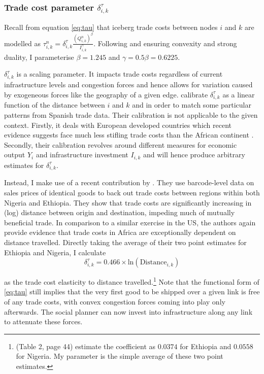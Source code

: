 \documentclass[11pt, oneside]{article}   	%
\begin{document}
\subsubsection{Trade cost parameter $\delta_{i,k}^{\tau}$}
Recall from equation \eqref{eq:tau} that iceberg trade costs between nodes $i$ and $k$ are modelled as $\tau_{i,k}^{n} = \delta^{\tau}_{i, k} \frac{(Q_{i,k}^{n})^{\beta}}{I_{i,k}^{\gamma}}$. Following \citeauthor{fajgelbaum_optimal_2017} and ensuring convexity and strong duality, I parameterise $\beta = 1.245$ and $\gamma = 0.5\beta = 0.6225$.

$\delta^{\tau}_{i, k}$ is a scaling parameter. It impacts trade costs regardless of current infrastructure levels and congestion forces and hence allows for variation caused by exogeneous forces like the geography of a given edge. \citeauthor{fajgelbaum_optimal_2017} calibrate $\delta^{\tau}_{i, k}$ as a linear function of the distance between $i$ and $k$ and in order to match some particular patterns from Spanish trade data. Their calibration is not applicable to the given context. Firstly, it deals with European developed countries which recent evidence suggests face much less stifling trade costs than the African continent \citep[see e.g.][]{Anderson_Tradecosts_2004}. Secondly, their calibration revolves around different measures for economic output $Y_{i}$ and infrastructure investment $I_{i,k}$ and will hence produce arbitrary estimates for $\delta^{\tau}_{i, k}$.

Instead, I make use of a recent contribution by \cite{atkin_whos_2015}. They use barcode-level data on sales prices of identical goods to back out trade costs between regions within both Nigeria and Ethiopia. They show that trade costs are significantly increasing in (log) distance between origin and destination, impeding much of mutually beneficial trade. In comparison to a similar exercise in the US, the authors again provide evidence that trade costs in Africa are exceptionally dependent on distance travelled. Directly taking the average of their two point estimates for Ethiopia and Nigeria, I calculate
\begin{equation}
  \delta^{\tau}_{i,k} =  0.466\times\textrm{ln}(\textrm{Distance}_{i,k})
  \label{eq:delta_tau}
\end{equation}

as the trade cost elasticity to distance travelled.\footnote{\citeauthor{atkin_whos_2015} (Table 2, page 44) estimate the coefficient as $0.0374$ for Ethiopia and $0.0558$ for Nigeria. My parameter is the simple average of these two point estimates.} Note that the functional form of \eqref{eq:tau} still implies that the very first good to be shipped over a given link is free of any trade costs, with convex congestion forces coming into play only  afterwards. The social planner can now invest into infrastructure along any link to attenuate these forces.
\end{document}

